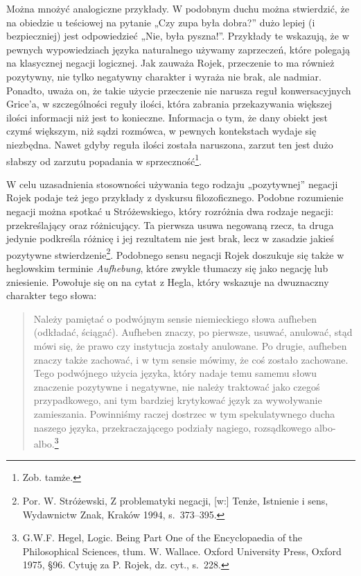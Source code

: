 Można mnożyć analogiczne przykłady. W podobnym duchu można stwierdzić,
że na obiedzie u teściowej na pytanie „Czy zupa była dobra?” dużo
lepiej (i bezpieczniej) jest odpowiedzieć „Nie, była pyszna!”.
Przykłady te wskazują, że w pewnych wypowiedziach  języka naturalnego
używamy zaprzeczeń, które polegają na klasycznej negacji logicznej. Jak
zauważa Rojek, przeczenie to ma również pozytywny, nie tylko negatywny
charakter i wyraża nie brak, ale nadmiar. Ponadto, uważa on, że takie
użycie przeczenie nie narusza reguł konwersacyjnych Grice’a, w
szczególności reguły ilości, która zabrania przekazywania większej
ilości informacji niż jest to konieczne. Informacja o tym, że dany
obiekt jest czymś większym, niż sądzi rozmówca, w pewnych kontekstach
wydaje się niezbędna. Nawet gdyby reguła ilości została naruszona,
zarzut ten jest dużo słabszy od zarzutu popadania w
sprzeczność\footnote{Zob. tamże. }.

W celu uzasadnienia stosowności używania tego rodzaju „pozytywnej”
negacji Rojek podaje też jego przykłady z dyskursu filozoficznego.
Podobne rozumienie negacji można spotkać u Stróżewskiego, który
rozróżnia dwa rodzaje negacji: przekreślający oraz różnicujący. Ta
pierwsza usuwa negowaną rzecz, ta druga jedynie podkreśla różnicę i jej
rezultatem nie jest brak, lecz w zasadzie jakieś pozytywne
stwierdzenie\footnote{Por. W. Stróżewski, Z problematyki negacji, [w:]
Tenże, Istnienie i sens, Wydawnictw Znak, Kraków 1994,
s.~373--395. }. Podobnego sensu negacji Rojek doszukuje się także
w heglowskim terminie \textit{Aufhebung}, które zwykle tłumaczy się
jako negację lub zniesienie. Powołuje się on na cytat z Hegla, który
wskazuje na dwuznaczny charakter tego słowa:

\begin{quote}
    Należy pamiętać o podwójnym sensie niemieckiego słowa aufheben
(odkładać, ściągać). Aufheben znaczy, po pierwsze, usuwać, anulować,
stąd mówi się, że prawo czy instytucja zostały anulowane. Po drugie,
aufheben znaczy także zachować, i w tym sensie mówimy, że coś zostało
zachowane. Tego podwójnego użycia języka, który nadaje temu samemu
słowu znaczenie pozytywne i negatywne, nie należy traktować jako czegoś
przypadkowego, ani tym bardziej krytykować język za wywoływanie
zamieszania. Powinniśmy raczej dostrzec w tym spekulatywnego ducha
naszego języka, przekraczającego podziały nagiego, rozsądkowego
albo-albo.\footnote{G.W.F. Hegel, Logic. Being Part One of the
Encyclopaedia of the Philosophical Sciences, tłum. W. Wallace. Oxford
University Press, Oxford 1975, §96. Cytuję za P. Rojek, dz. cyt.,
s.~228. }
\end{quote}






